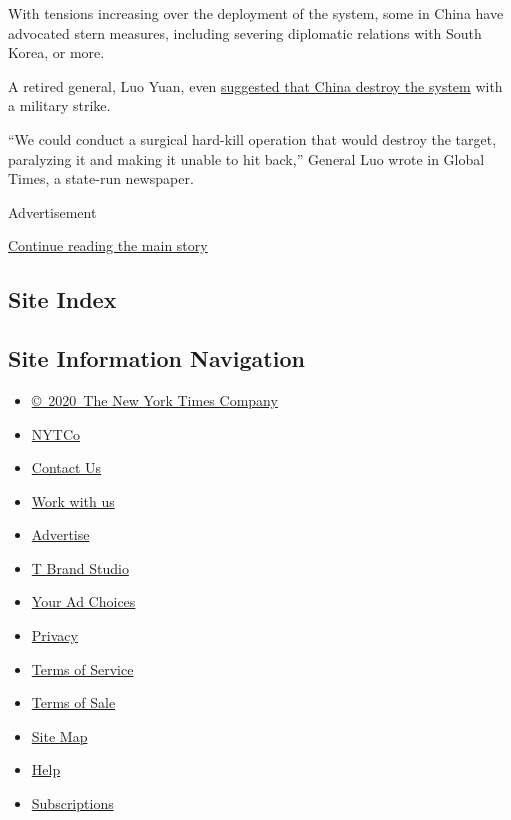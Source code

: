 With tensions increasing over the deployment of the system, some in
China have advocated stern measures, including severing diplomatic
relations with South Korea, or more.

A retired general, Luo Yuan, even
\href{https://www.nytimes3xbfgragh.onion/2017/03/02/world/asia/china-north-south-korea.html}{suggested
that China destroy the system} with a military strike.

``We could conduct a surgical hard-kill operation that would destroy the
target, paralyzing it and making it unable to hit back,'' General Luo
wrote in Global Times, a state-run newspaper.

Advertisement

\protect\hyperlink{after-bottom}{Continue reading the main story}

\hypertarget{site-index}{%
\subsection{Site Index}\label{site-index}}

\hypertarget{site-information-navigation}{%
\subsection{Site Information
Navigation}\label{site-information-navigation}}

\begin{itemize}
\tightlist
\item
  \href{https://help.nytimes3xbfgragh.onion/hc/en-us/articles/115014792127-Copyright-notice}{©~2020~The
  New York Times Company}
\end{itemize}

\begin{itemize}
\tightlist
\item
  \href{https://www.nytco.com/}{NYTCo}
\item
  \href{https://help.nytimes3xbfgragh.onion/hc/en-us/articles/115015385887-Contact-Us}{Contact
  Us}
\item
  \href{https://www.nytco.com/careers/}{Work with us}
\item
  \href{https://nytmediakit.com/}{Advertise}
\item
  \href{http://www.tbrandstudio.com/}{T Brand Studio}
\item
  \href{https://www.nytimes3xbfgragh.onion/privacy/cookie-policy\#how-do-i-manage-trackers}{Your
  Ad Choices}
\item
  \href{https://www.nytimes3xbfgragh.onion/privacy}{Privacy}
\item
  \href{https://help.nytimes3xbfgragh.onion/hc/en-us/articles/115014893428-Terms-of-service}{Terms
  of Service}
\item
  \href{https://help.nytimes3xbfgragh.onion/hc/en-us/articles/115014893968-Terms-of-sale}{Terms
  of Sale}
\item
  \href{https://spiderbites.nytimes3xbfgragh.onion}{Site Map}
\item
  \href{https://help.nytimes3xbfgragh.onion/hc/en-us}{Help}
\item
  \href{https://www.nytimes3xbfgragh.onion/subscription?campaignId=37WXW}{Subscriptions}
\end{itemize}
